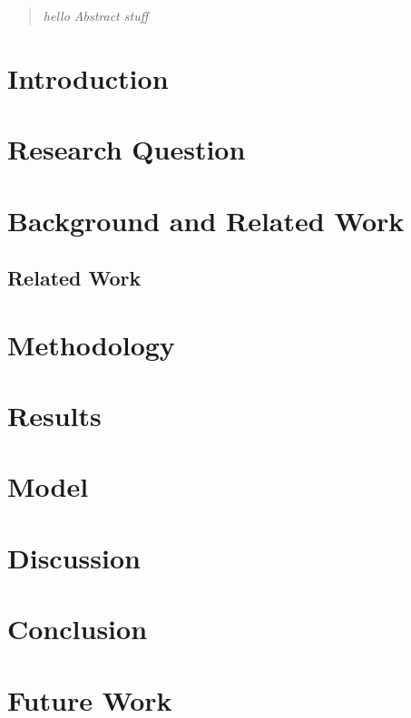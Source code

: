 \documentclass[A4]{scrartcl}
\begin{document}
\newpage

\begin{abstract}
	\textit{hello Abstract stuff}
\end{abstract}

\tableofcontents
\newpage




\section{Introduction}
\label{sec:introduction}



\section{Research Question}
\label{research-questions}


%

\section{Background and Related Work}
\label{background}


\subsection{Related Work}
\label{related-work}


\section{Methodology}
\label{methodology}


\section{Results}
\label{results}


\newpage

\section{Model}
\label{model}


\section{Discussion}
\label{discussion}



\section{Conclusion}
\label{conclusion}


\section{Future Work}
\label{future-work}



\newpage
\printbibliography
\end{document}
